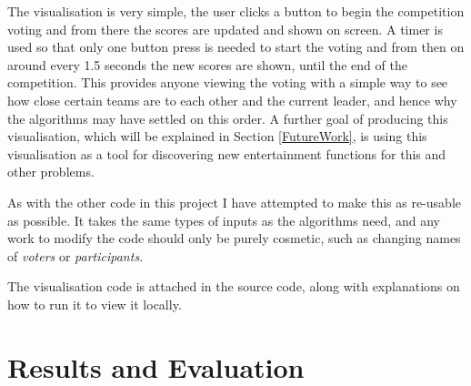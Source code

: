 \documentclass[12pt]{report}
\begin{document}
The visualisation is very simple, the user clicks a button to begin the competition voting and from there the scores are updated and shown on screen. A timer is used so that only one button press is needed to start the voting and from then on around every 1.5 seconds the new scores are shown, until the end of the competition. This provides anyone viewing the voting with a simple way to see how close certain teams are to each other and the current leader, and hence why the algorithms may have settled on this order. A further goal of producing this visualisation, which will be explained in Section \ref{FutureWork}, is using this visualisation as a tool for discovering new entertainment functions for this and other problems. 

As with the other code in this project I have attempted to make this as re-usable as possible. It takes the same types of inputs as the algorithms need, and any work to modify the code should only be purely cosmetic, such as changing names of \textit{voters} or \textit{participants}.

The visualisation code is attached in the source code, along with explanations on how to run it to view it locally.

\section{Results and Evaluation}\label{Results}
\end{document}
